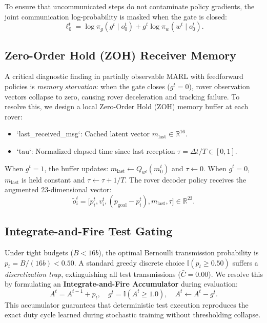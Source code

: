 \documentclass[10pt,twocolumn,letterpaper]{article}
\begin{document}
To ensure that uncommunicated steps do not contaminate policy gradients, the joint communication log-probability is masked when the gate is closed:
\begin{equation}
    \ell_0^t = \log \pi_g(g^t \mid o_0^t) + g^t \log \pi_w(w^t \mid o_0^t).
\end{equation}

\subsection{Zero-Order Hold (ZOH) Receiver Memory}
A critical diagnostic finding in partially observable MARL with feedforward policies is \textit{memory starvation}: when the gate closes ($g^t = 0$), rover observation vectors collapse to zero, causing rover deceleration and tracking failure. 
To resolve this, we design a local Zero-Order Hold (ZOH) memory buffer at each rover:
\begin{itemize}
    \item `last\_received\_msg`: Cached latent vector $m_{\mathrm{last}} \in \mathbb{R}^{16}$.
    \item `tau`: Normalized elapsed time since last reception $\tau = \Delta t / T \in [0, 1]$.
\end{itemize}
When $g^t = 1$, the buffer updates: $m_{\mathrm{last}} \leftarrow Q_{w^t}(m_0^t)$ and $\tau \leftarrow 0$. When $g^t = 0$, $m_{\mathrm{last}}$ is held constant and $\tau \leftarrow \tau + 1/T$. The rover decoder policy receives the augmented 23-dimensional vector:
\begin{equation}
    \tilde{o}_i^t = \big[ p_i^t, v_i^t, (p_{\mathrm{goal}} - p_i^t), m_{\mathrm{last}}, \tau \big] \in \mathbb{R}^{23}.
\end{equation}

\subsection{Integrate-and-Fire Test Gating}
Under tight budgets ($B < 16b$), the optimal Bernoulli transmission probability is $p_t = B / (16b) < 0.50$. A standard greedy discrete choice $\mathbb{I}(p_t \ge 0.50)$ suffers a \textit{discretization trap}, extinguishing all test transmissions ($\bar{C} = 0.00$). 
We resolve this by formulating an \textbf{Integrate-and-Fire Accumulator} during evaluation:
\begin{equation}
    A^t = A^{t-1} + p_t, \quad g^t = \mathbb{I}(A^t \ge 1.0), \quad A^t \leftarrow A^t - g^t.
\end{equation}
This accumulator guarantees that deterministic test execution reproduces the exact duty cycle learned during stochastic training without thresholding collapse.
\end{document}
